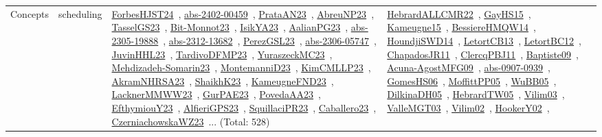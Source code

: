 {\begin{longtable}{lp{3cm}>{\raggedright\arraybackslash}p{6cm}>{\raggedright\arraybackslash}p{6cm}>{\raggedright\arraybackslash}p{8cm}}
Concepts & scheduling & \href{works/ForbesHJST24.pdf}{ForbesHJST24}~\cite{ForbesHJST24}, \href{works/abs-2402-00459.pdf}{abs-2402-00459}~\cite{abs-2402-00459}, \href{works/PrataAN23.pdf}{PrataAN23}~\cite{PrataAN23}, \href{works/AbreuNP23.pdf}{AbreuNP23}~\cite{AbreuNP23}, \href{works/TasselGS23.pdf}{TasselGS23}~\cite{TasselGS23}, \href{works/Bit-Monnot23.pdf}{Bit-Monnot23}~\cite{Bit-Monnot23}, \href{works/IsikYA23.pdf}{IsikYA23}~\cite{IsikYA23}, \href{works/AalianPG23.pdf}{AalianPG23}~\cite{AalianPG23}, \href{works/abs-2305-19888.pdf}{abs-2305-19888}~\cite{abs-2305-19888}, \href{works/abs-2312-13682.pdf}{abs-2312-13682}~\cite{abs-2312-13682}, \href{works/PerezGSL23.pdf}{PerezGSL23}~\cite{PerezGSL23}, \href{works/abs-2306-05747.pdf}{abs-2306-05747}~\cite{abs-2306-05747}, \href{works/JuvinHHL23.pdf}{JuvinHHL23}~\cite{JuvinHHL23}, \href{works/TardivoDFMP23.pdf}{TardivoDFMP23}~\cite{TardivoDFMP23}, \href{works/YuraszeckMC23.pdf}{YuraszeckMC23}~\cite{YuraszeckMC23}, \href{works/Mehdizadeh-Somarin23.pdf}{Mehdizadeh-Somarin23}~\cite{Mehdizadeh-Somarin23}, \href{works/MontemanniD23.pdf}{MontemanniD23}~\cite{MontemanniD23}, \href{works/KimCMLLP23.pdf}{KimCMLLP23}~\cite{KimCMLLP23}, \href{works/AkramNHRSA23.pdf}{AkramNHRSA23}~\cite{AkramNHRSA23}, \href{works/ShaikhK23.pdf}{ShaikhK23}~\cite{ShaikhK23}, \href{works/KameugneFND23.pdf}{KameugneFND23}~\cite{KameugneFND23}, \href{works/LacknerMMWW23.pdf}{LacknerMMWW23}~\cite{LacknerMMWW23}, \href{works/GurPAE23.pdf}{GurPAE23}~\cite{GurPAE23}, \href{works/PovedaAA23.pdf}{PovedaAA23}~\cite{PovedaAA23}, \href{works/EfthymiouY23.pdf}{EfthymiouY23}~\cite{EfthymiouY23}, \href{works/AlfieriGPS23.pdf}{AlfieriGPS23}~\cite{AlfieriGPS23}, \href{works/SquillaciPR23.pdf}{SquillaciPR23}~\cite{SquillaciPR23}, \href{works/Caballero23.pdf}{Caballero23}~\cite{Caballero23}, \href{works/CzerniachowskaWZ23.pdf}{CzerniachowskaWZ23}~\cite{CzerniachowskaWZ23}... (Total: 528) & \href{works/HebrardALLCMR22.pdf}{HebrardALLCMR22}~\cite{HebrardALLCMR22}, \href{works/GayHS15.pdf}{GayHS15}~\cite{GayHS15}, \href{works/Kameugne15.pdf}{Kameugne15}~\cite{Kameugne15}, \href{works/BessiereHMQW14.pdf}{BessiereHMQW14}~\cite{BessiereHMQW14}, \href{works/HoundjiSWD14.pdf}{HoundjiSWD14}~\cite{HoundjiSWD14}, \href{works/LetortCB13.pdf}{LetortCB13}~\cite{LetortCB13}, \href{works/LetortBC12.pdf}{LetortBC12}~\cite{LetortBC12}, \href{works/ChapadosJR11.pdf}{ChapadosJR11}~\cite{ChapadosJR11}, \href{works/ClercqPBJ11.pdf}{ClercqPBJ11}~\cite{ClercqPBJ11}, \href{works/Baptiste09.pdf}{Baptiste09}~\cite{Baptiste09}, \href{works/Acuna-AgostMFG09.pdf}{Acuna-AgostMFG09}~\cite{Acuna-AgostMFG09}, \href{works/abs-0907-0939.pdf}{abs-0907-0939}~\cite{abs-0907-0939}, \href{works/GomesHS06.pdf}{GomesHS06}~\cite{GomesHS06}, \href{works/MoffittPP05.pdf}{MoffittPP05}~\cite{MoffittPP05}, \href{works/WuBB05.pdf}{WuBB05}~\cite{WuBB05}, \href{works/DilkinaDH05.pdf}{DilkinaDH05}~\cite{DilkinaDH05}, \href{works/HebrardTW05.pdf}{HebrardTW05}~\cite{HebrardTW05}, \href{works/Vilim03.pdf}{Vilim03}~\cite{Vilim03}, \href{works/ValleMGT03.pdf}{ValleMGT03}~\cite{ValleMGT03}, \href{works/Vilim02.pdf}{Vilim02}~\cite{Vilim02}, \href{works/HookerY02.pdf}{HookerY02}~\cite{HookerY02}, 
\end{longtable}}
